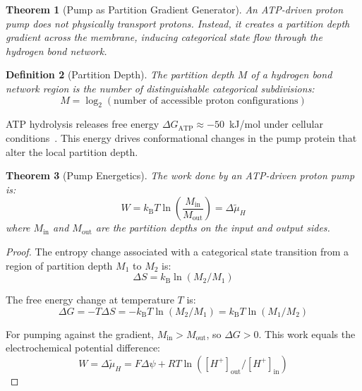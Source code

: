 \documentclass[twocolumn,showpacs,preprintnumbers,amsmath,amssymb,prd]{revtex4-2}
\newtheorem{theorem}{Theorem}[section]
\newtheorem{definition}[theorem]{Definition}
\newcommand{\kB}{k_{\text{B}}}
\begin{document}
\begin{theorem}[Pump as Partition Gradient Generator]
\label{thm:pump_mechanism}
An ATP-driven proton pump does not physically transport protons. Instead, it creates a partition depth gradient across the membrane, inducing categorical state flow through the hydrogen bond network.
\end{theorem}

\begin{definition}[Partition Depth]
\label{def:partition_depth}
The partition depth $M$ of a hydrogen bond network region is the number of distinguishable categorical subdivisions:
\begin{equation}
M = \log_2(\text{number of accessible proton configurations})
\label{eq:partition_depth}
\end{equation}
\end{definition}

ATP hydrolysis releases free energy $\Delta G_{\text{ATP}} \approx -50$~kJ/mol under cellular conditions~\cite{Nicholls2013}. This energy drives conformational changes in the pump protein that alter the local partition depth.

\begin{theorem}[Pump Energetics]
\label{thm:pump_energetics}
The work done by an ATP-driven proton pump is:
\begin{equation}
W = \kB T \ln\left(\frac{M_{\text{in}}}{M_{\text{out}}}\right) = \Delta\tilde{\mu}_H
\label{eq:pump_work}
\end{equation}
where $M_{\text{in}}$ and $M_{\text{out}}$ are the partition depths on the input and output sides.
\end{theorem}

\begin{proof}
The entropy change associated with a categorical state transition from a region of partition depth $M_1$ to $M_2$ is:
\begin{equation}
\Delta S = \kB \ln(M_2/M_1)
\label{eq:entropy_change}
\end{equation}

The free energy change at temperature $T$ is:
\begin{equation}
\Delta G = -T\Delta S = -\kB T \ln(M_2/M_1) = \kB T \ln(M_1/M_2)
\label{eq:free_energy_partition}
\end{equation}

For pumping against the gradient, $M_{\text{in}} > M_{\text{out}}$, so $\Delta G > 0$. This work equals the electrochemical potential difference:
\begin{equation}
W = \Delta\tilde{\mu}_H = F\Delta\psi + RT\ln([H^+]_{\text{out}}/[H^+]_{\text{in}})
\end{equation}
\end{proof}
\end{document}
